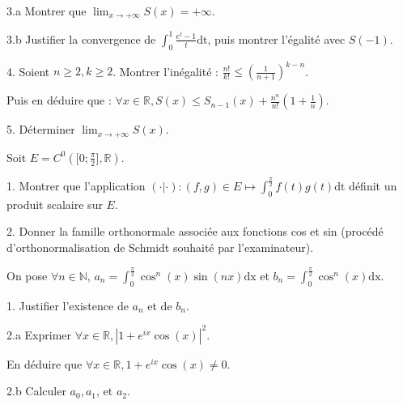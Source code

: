 \vspace{5pt}
3.a Montrer que $\displaystyle \lim_{x\to+\infty}S(x) = +\infty$.

\vspace{5pt}
3.b Justifier la convergence de $\displaystyle \int_{0}^{1} \frac {e^t-1} {t}\mathrm{dt}$, puis montrer l'égalité avec $S(-1)$.

\vspace{5pt}
4. Soient $n \geqslant 2, k \geqslant 2$. Montrer l'inégalité :
$\displaystyle \frac {n!} {k!} \leqslant \left( \frac {1} {n+1}\right)^{k-n}$.

Puis en déduire que :
$\displaystyle \forall x \in \mathbb{R}, S(x) \leqslant S_{n-1}(x) + \frac {n^n} {n!}\left(1+\frac {1} {n} \right)$.

\vspace{5pt}
5. Déterminer $\displaystyle \lim_{x\to+\infty} S(x)$.




\subetoiles




\noindent Soit $E = C^0(\lbrack 0; \frac {\pi} {2} \rbrack, \mathbb{R})$.

\vspace{5pt}
1. Montrer que l'application
$\displaystyle (\cdot|\cdot) : (f,g) \in E \mapsto \int_{0}^{\frac {\pi} {2}}f(t)g(t)\mathrm{dt}$
définit un produit scalaire sur $E$.

\vspace{5pt}
2. Donner la famille orthonormale associée aux fonctions cos et sin
(procédé d'orthonormalisation de Schmidt souhaité par l'examinateur).



\subetoiles
\columnbreak



\noindent On pose $\forall n \in \mathbb{N}$,
$\displaystyle a_n = \int_{0}^{\frac {\pi} {2}} \cos^n(x)\sin(nx)\mathrm{dx}$
et $\displaystyle b_n = \int_{0}^{\frac {\pi} {2}} \cos^n(x)\mathrm{dx}$.

\vspace{5pt}
1. Justifier l'existence de $a_n$ et de $b_n$.

\vspace{5pt}
2.a Exprimer $\forall x \in \mathbb{R}, |1 + e^{ix}\cos(x)|^2$.

En déduire que $\forall x \in \mathbb{R}, 1+e^{ix}\cos(x) \ne 0$.

\vspace{5pt}
2.b Calculer $a_0, a_1$, et $a_2$.

